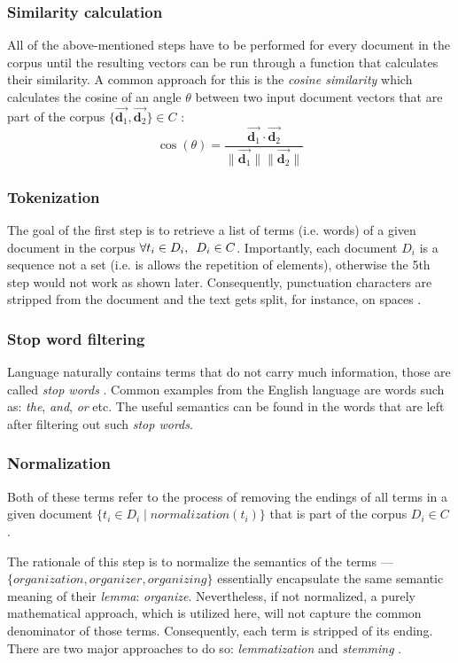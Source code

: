 \documentclass[12pt,a4paper]{report}
\begin{document}
\subsubsection{Similarity calculation}
All of the above-mentioned steps have to be performed for every document
in the corpus until the resulting vectors can be run through a function that
calculates their similarity. A common approach for this is the
\textit{cosine similarity} which calculates the cosine of an angle \(\theta\)
between two input document vectors that are part of the corpus
\(\{\vec{\mathbf d_1}, \vec{\mathbf d_2}\} \in C\) \cite{singhal2001ir}:
\[
  \cos(\theta) = \frac{
    \vec{\mathbf d_1} \cdot \vec{\mathbf d_2}
  }{
    \|\vec{\mathbf d_1} \|\|\vec{\mathbf d_2} \|
  }
\]


\subsubsection{Tokenization}
The goal of the first step is to retrieve a list of terms (i.e. words)
of a given document in the corpus \(\forall t_i \in D_i, \enskip D_i \in C\).
Importantly, each document \(D_i\) is a sequence not a set
(i.e. is allows the repetition of elements), otherwise the 5th step would not
work as shown later.
Consequently, punctuation characters are stripped from the document and
the text gets split, for instance, on spaces \cite{singhal2001ir}.


\subsubsection{Stop word filtering}
Language naturally contains terms that do not carry much information,
those are called \textit{stop words} \cite{singhal2001ir}.
Common examples from the English language are words such as:
\textit{the}, \textit{and}, \textit{or} etc.
The useful semantics can be found in the words that are left after filtering
out such \textit{stop words}.


\subsubsection{Normalization}
Both of these terms refer to the process of removing the endings of all terms
in a given document \(\{t_i \in D_i \mid normalization(t_i)\}\) that is part of
the corpus \(D_i \in C\) \cite{singhal2001ir}.

The rationale of this step is to normalize the semantics of the terms ---
\(\{\textit{organization}, \textit{organizer}, \textit{organizing}\}\) essentially
encapsulate the same semantic meaning of their \textit{lemma}: \textit{organize}.
Nevertheless, if not normalized, a purely mathematical approach,
which is utilized here, will not capture the common denominator of those terms.
Consequently, each term is stripped of its ending. There are two major approaches
to do so: \textit{lemmatization} and \textit{stemming} \cite{plisson2004lemma}.
\end{document}
